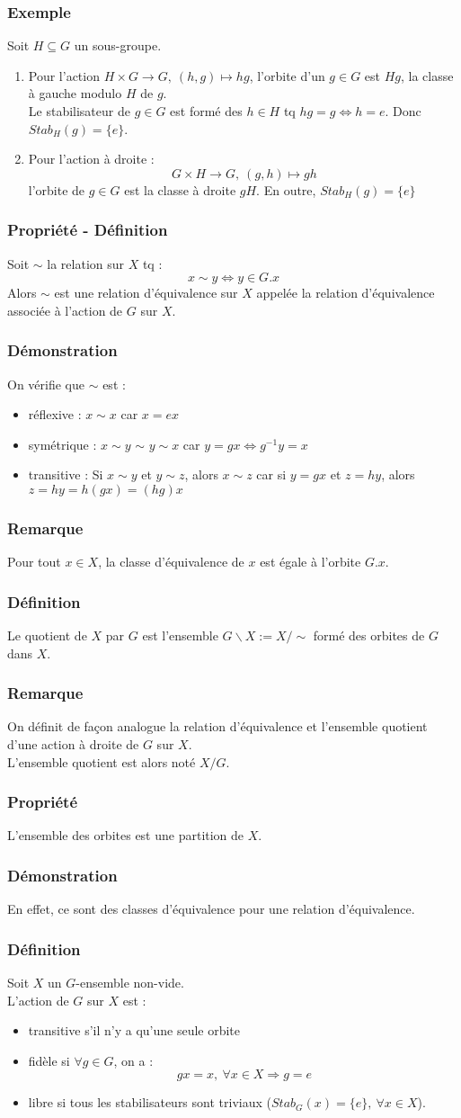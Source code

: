 \documentclass[a4paper, oneside]{report}
\newcommand{\x}{\times}
\newcommand{\defi}{\subsubsection{Définition}}
\newcommand{\dem}{\subsubsection{Démonstration}}
\newcommand{\propr}{\subsubsection{Propriété}}
\newcommand{\remar}{\subsubsection{Remarque}}
\newcommand{\exem}{\subsubsection{Exemple}}
\begin{document}
\exem 
Soit $H\subseteq G$ un sous-groupe.
\begin{enumerate}
\item Pour l'action $H\x G \rightarrow G,~(h,g)\mapsto hg$, l'orbite d'un $g\in G$ est $Hg$, la classe à gauche modulo $H$ de $g$.\\
Le stabilisateur de $g\in G$ est formé des $h\in H$ tq $hg=g \Leftrightarrow h=e$. Donc $Stab_H(g)=\{e\}$.\\
\item Pour l'action à droite :
$$G\x H \rightarrow G,~(g,h)\mapsto gh$$
l'orbite de $g\in G$ est la classe à droite $gH$. En outre, $Stab_H(g)=\{e\}$
\end{enumerate}

\subsubsection{Propriété - Définition}
Soit $\sim$ la relation sur $X$ tq :
$$x\sim y \Leftrightarrow y\in G.x$$
Alors $\sim$ est une relation d'équivalence sur $X$ appelée la relation d'équivalence associée à l'action de $G$ sur $X$.

\dem
On vérifie que $\sim$ est :
\begin{itemize}
\item réflexive : $x\sim x$ car $x=ex$
\item symétrique : $x\sim y$ $\sim$ $y\sim x$ car $y=gx\Leftrightarrow g^{-1}y=x$
\item transitive : Si $x\sim y$ et $y\sim z$, alors $x\sim z$ car si $y=gx$ et $z=hy$, alors $z=hy=h(gx)=(hg)x$
\end{itemize}

\remar
Pour tout $x\in X$, la classe d'équivalence de $x$ est égale à l'orbite $G.x$.

\defi 
Le quotient de $X$ par $G$ est l'ensemble $G\backslash X := X/\sim$ formé des orbites de $G$ dans $X$.

\remar
On définit de façon analogue la relation d'équivalence et l'ensemble quotient d'une action à droite de $G$ sur $X$.\\
L'ensemble quotient est alors noté $X/G$.

\propr
L'ensemble des orbites est une partition de $X$.

\dem
En effet, ce sont des classes d'équivalence pour une relation d'équivalence.

\defi 
Soit $X$ un $G$-ensemble non-vide.\\
L'action de $G$ sur $X$ est :
\begin{itemize}
\item transitive s'il n'y a qu'une seule orbite
\item fidèle si $\forall g\in G$, on a :
$$gx=x,~\forall x\in X \Rightarrow g=e$$
\item libre si tous les stabilisateurs sont triviaux ($Stab_G(x)=\{e\},~\forall x\in X$).
\end{itemize}
\end{document}
